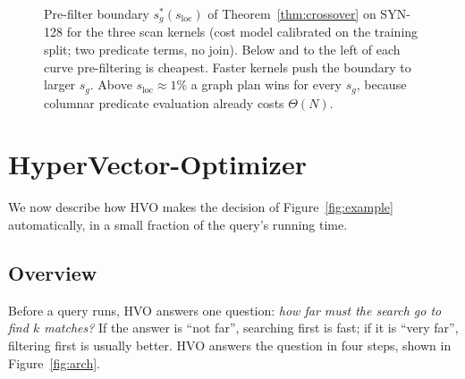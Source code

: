 \documentclass[sigconf,nonacm]{acmart}
\begin{document}
\begin{figure}[!t]
\centering
{}
\caption{Pre-filter boundary $s_g^*(s_{\text{loc}})$ of Theorem~\ref{thm:crossover} on SYN-128 for the three scan kernels (cost model calibrated on the training split; two predicate terms, no join). Below and to the left of each curve pre-filtering is cheapest. Faster kernels push the boundary to larger $s_g$. Above $s_{\text{loc}}\approx1\%$ a graph plan wins for every $s_g$, because columnar predicate evaluation already costs $\Theta(N)$.}
\label{fig:phase}
\end{figure}

\section{HyperVector-Optimizer}\label{sec:method}
We now describe how HVO makes the decision of Figure~\ref{fig:example} automatically, in a small fraction of the query's running time.

\subsection{Overview}\label{sec:overview}
Before a query runs, HVO answers one question: \emph{how far must the search go to find $k$ matches?} If the answer is ``not far'', searching first is fast; if it is ``very far'', filtering first is usually better. HVO answers the question in four steps, shown in Figure~\ref{fig:arch}.
\end{document}
